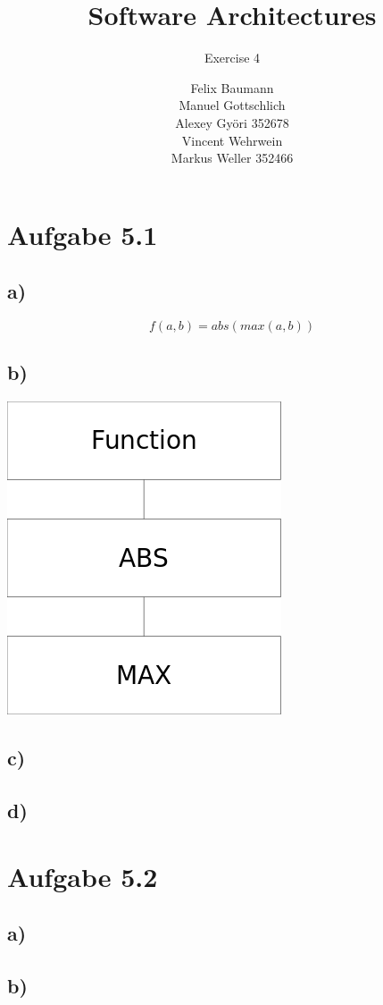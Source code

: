 \documentclass[a4paper,10pt]{scrartcl}[2003/01/01]
\title{Software Architectures}
\subtitle{Exercise 4}
\author{ Felix Baumann \\ Manuel Gottschlich \\  Alexey Gy\"ori 352678 \\ Vincent Wehrwein \\ Markus Weller 352466}
\begin{document}
    \maketitle
    
    \section*{Aufgabe 5.1}
        \subsection*{a)}
         $$f(a,b) = abs(max(a,b))$$
        \subsection*{b)}
         \includegraphics[scale=0.5]{dia1}
        \subsection*{c)}
        
        \subsection*{d)}
        
    \section*{Aufgabe 5.2}
        \subsection*{a)}
        \subsection*{b)}
\end{document}
